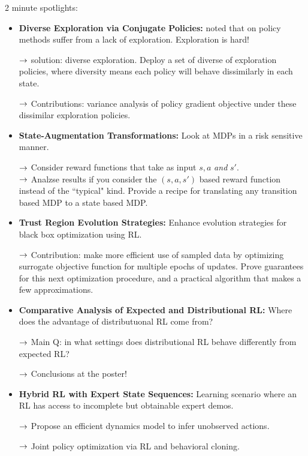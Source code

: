 2 minute spotlights:
\begin{itemize}
    \item {\bf Diverse Exploration via Conjugate Policies:} noted that on policy methods suffer from a lack of exploration. Exploration is hard!
    
    $\rightarrow$ solution: diverse exploration. Deploy a set of diverse of exploration policies, where diversity means each policy will behave dissimilarly in each state. 
    
    $\rightarrow$ Contributions: variance analysis of policy gradient objective under these dissimilar exploration policies.
    
    \item {\bf State-Augmentation Transformations:} Look at MDPs in a risk sensitive manner. 
    
    $\rightarrow$ Consider reward functions that take as input $s,a$ {\it and} $s'$. \\
    
    $\rightarrow$ Analzse results if you consider the $(s,a,s')$ based reward function instead of the ``typical" kind. Provide a recipe for translating any transition based MDP to a state based MDP.
    
    \item {\bf Trust Region Evolution Strategies:} Enhance evolution strategies for black box optimization using RL.
    
    $\rightarrow$ Contribution: make more efficient use of sampled data by optimizing surrogate objective function for multiple epochs of updates. Prove guarantees for this next optimization procedure, and a practical algorithm that makes a few approximations.
    
    \item {\bf Comparative Analysis of Expected and Distributional RL:} Where does the advantage of distributuonal RL come from?
    
    $\rightarrow$ Main Q: in what settings does distributional RL behave differently from expected RL?
    
    $\rightarrow$ Conclusions at the poster!
    
    \item {\bf Hybrid RL with Expert State Sequences:} Learning scenario where an RL has access to incomplete but obtainable expert demos.
    
    $\rightarrow$ Propose an efficient dynamics model to infer unobserved actions.
    
    $\rightarrow$ Joint policy optimization via RL and behavioral cloning.
    

\end{itemize}
